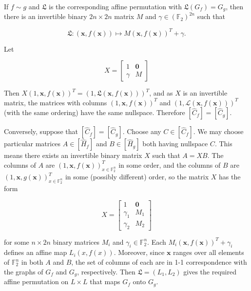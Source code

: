 \documentclass[10pt]{article}
\begin{document}
If $f \sim g$ and $\mathfrak{L}$ is the corresponding affine permutation with $\mathfrak{L}\left(G_{f}\right)=G_{g}$, then there is an invertible binary $2 n \times 2 n$ matrix $M$ and $\gamma \in\left(\mathbb{F}_{2}\right)^{2 n}$ such that

$$
\mathfrak{L}:(\mathbf{x}, f(\mathbf{x})) \mapsto M(\mathbf{x}, f(\mathbf{x}))^{T}+\gamma .
$$

Let

$$
X=\left[\begin{array}{cc}
1 & \mathbf{0} \\
\gamma & M
\end{array}\right]
$$

Then $X(1, \mathbf{x}, f(\mathbf{x}))^{T}=(1, \mathfrak{L}(\mathbf{x}, f(\mathbf{x})))^{T}$, and as $X$ is an invertible matrix, the matrices with columns $(1, \mathbf{x}, f(\mathbf{x}))^{T}$ and $(1, \mathcal{L}(\mathbf{x}, f(\mathbf{x})))^{T}$ (with the same ordering) have the same nullspace. Therefore $\left[\widehat{C}_{f}\right]=\left[\widehat{C}_{g}\right]$.

Conversely, suppose that $\left[\widehat{C}_{f}\right]=\left[\widehat{C}_{g}\right]$. Choose any $C \in\left[\widehat{C}_{f}\right]$. We may choose particular matrices $A \in\left[\widehat{H}_{f}\right]$ and $B \in\left[\widehat{H}_{g}\right]$ both having nullspace $C$. This means there exists an invertible binary matrix $X$ such that $A=X B$. The columns of $A$ are $(1, \mathbf{x}, f(\mathbf{x}))_{x \in \mathbb{F}_{2}^{n}}^{T}$ in some order, and the columns of $B$ are $(1, \mathbf{x}, g(\mathbf{x}))_{x \in \mathbb{F}_{2}^{n}}^{T}$ in some (possibly different) order, so the matrix $X$ has the form

$$
X=\left[\begin{array}{cc}
1 & \mathbf{0} \\
\gamma_{1} & M_{1} \\
\gamma_{2} & M_{2}
\end{array}\right]
$$

for some $n \times 2 n$ binary matrices $M_{i}$ and $\gamma_{i} \in \mathbb{F}_{2}^{n}$. Each $M_{i}(\mathbf{x}, f(\mathbf{x}))^{T}+\gamma_{i}$ defines an affine map $L_{i}(x, f(x))$. Moreover, since $\mathbf{x}$ ranges over all elements of $\mathbb{F}_{2}^{n}$ in both $A$ and $B$, the set of columns of each are in 1-1 correspondence with the graphs of $G_{f}$ and $G_{g}$, respectively. Then $\mathfrak{L}=\left(L_{1}, L_{2}\right)$ gives the required affine permutation on $L \times L$ that maps $G_{f}$ onto $G_{g}$.
\end{document}
